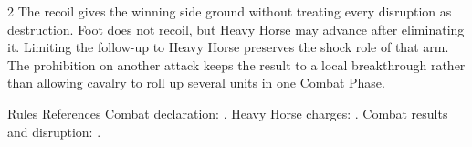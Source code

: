 \begin{multicols}{2}
The recoil gives the winning side ground without treating every disruption as
destruction. Foot does not recoil, but Heavy Horse may advance after eliminating
it. Limiting the follow-up to Heavy Horse preserves the shock role of that arm.
The prohibition on another attack keeps the result to a local breakthrough
rather than allowing cavalry to roll up several units in one Combat Phase.

\begin{rulebox}{Rules References}
Combat declaration: . Heavy Horse charges: .
Combat results and disruption: .
\end{rulebox}
\end{multicols}
